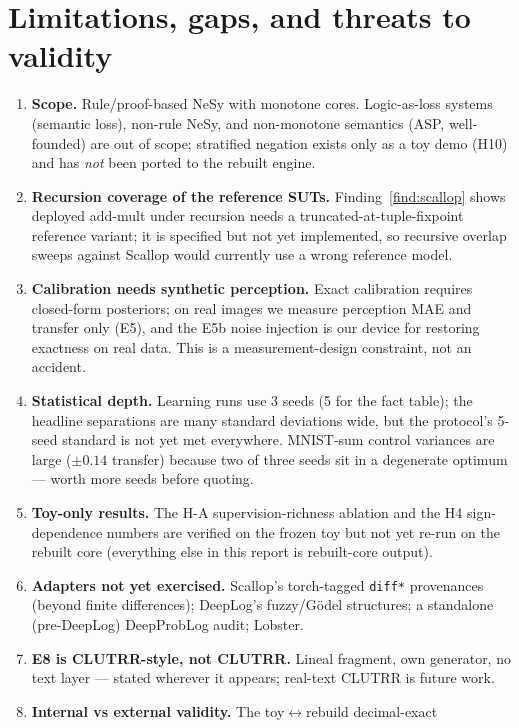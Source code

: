 \documentclass[10pt]{article}
\theoremstyle{remark}
\begin{document}
\section{Limitations, gaps, and threats to validity}\label{sec:limitations}

\begin{enumerate}[leftmargin=2em]
\item \textbf{Scope.} Rule/proof-based NeSy with monotone cores. Logic-as-loss systems (semantic
loss), non-rule NeSy, and non-monotone semantics (ASP, well-founded) are out of scope; stratified
negation exists only as a toy demo (H10) and has \emph{not} been ported to the rebuilt engine.
\item \textbf{Recursion coverage of the reference SUTs.} Finding~\ref{find:scallop} shows deployed
add-mult under recursion needs a truncated-at-tuple-fixpoint reference variant; it is specified
but not yet implemented, so recursive overlap sweeps against Scallop would currently use a wrong
reference model.
\item \textbf{Calibration needs synthetic perception.} Exact calibration requires closed-form
posteriors; on real images we measure perception MAE and transfer only (E5), and the E5b noise
injection is our device for restoring exactness on real data. This is a measurement-design
constraint, not an accident.
\item \textbf{Statistical depth.} Learning runs use 3 seeds (5 for the fact table); the headline
separations are many standard deviations wide, but the protocol's 5-seed standard is not yet met
everywhere. MNIST-sum control variances are large ($\pm0.14$ transfer) because two of three seeds
sit in a degenerate optimum --- worth more seeds before quoting.
\item \textbf{Toy-only results.} The H-A supervision-richness ablation and the H4 sign-dependence
numbers are verified on the frozen toy but not yet re-run on the rebuilt core (everything else in
this report is rebuilt-core output).
\item \textbf{Adapters not yet exercised.} Scallop's torch-tagged \texttt{diff*} provenances
(beyond finite differences); DeepLog's fuzzy/G\"odel structures; a standalone (pre-DeepLog)
DeepProbLog audit; Lobster.
\item \textbf{E8 is CLUTRR-style, not CLUTRR.} Lineal fragment, own generator, no text layer ---
stated wherever it appears; real-text CLUTRR is future work.
\item \textbf{Internal vs external validity.} The toy$\leftrightarrow$rebuild decimal-exact

\end{enumerate}
\end{document}
